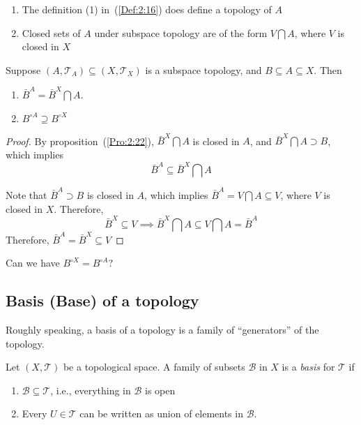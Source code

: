 \begin{proposition}\label{Pro:2:22}
\begin{enumerate}
\item
The definition (1) in~(\ref{Def:2:16}) does define a topology of $A$
\item
Closed sets of $A$ under subspace topology are of the form $V\bigcap A$, where $V$ is closed in $X$
\end{enumerate}
\end{proposition}

\begin{proposition}
Suppose $(A,\mathcal{T}_A)\subseteq(X,\mathcal{T}_X)$ is a subspace topology, and $B\subseteq A\subseteq X$. Then 
\begin{enumerate}
\item
$\bar B^A=\bar B^X\bigcap A$.
\item
$B^{\circ A}\supseteq B^{\circ X}$
\end{enumerate}
\end{proposition}

\begin{proof}
By proposition~(\ref{Pro:2:22}), $\bar B^X\bigcap A$ is closed in $A$, and $\bar B^X\bigcap A\supset B$, which implies
\[
\bar B^A\subseteq \bar B^X\bigcap A
\] 

Note that $\bar B^A\supset B$ is closed in $A$, which implies $\bar B^A=V\bigcap A\subseteq V$, where $V$ is closed in $X$. Therefore,
\[
\bar B^X\subseteq V\implies
\bar B^X\bigcap A\subseteq V\bigcap A=\bar B^A
\]
Therefore, $\bar B^A=\bar B^X\subseteq V$

\end{proof}

Can we have $B^{\circ X}=B^{\circ A}$?

\subsection{Basis (Base) of a topology}

Roughly speaking, a basis of a topology is a family of ``generators'' of the topology.
\begin{definition}
Let $(X,\mathcal{T})$ be a topological space. A family of subsets $\mathcal{B}$ in $X$ is a \emph{basis} for $\mathcal{T}$ if
\begin{enumerate}
\item
$\mathcal{B}\subseteq\mathcal{T}$, i.e., everything in $\mathcal{B}$ is open
\item
Every $U\in\mathcal{T}$ can be written as union of elements in $\mathcal{B}$.
\end{enumerate}
\end{definition}

